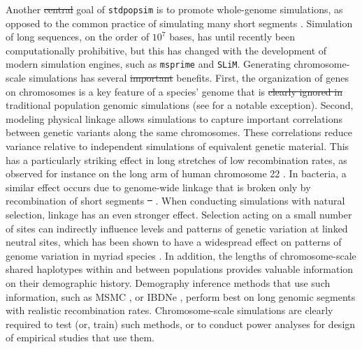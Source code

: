 \documentclass[hidelinks]{article}
\newcommand{\stdpopsim}{\texttt{stdpopsim}\xspace}
\providecommand{\DIFaddtex}[1]{{\protect\color{blue}\uwave{#1}}} %
\providecommand{\DIFdeltex}[1]{{\protect\color{red}\sout{#1}}}                      %
\providecommand{\DIFaddbegin}{} %
\providecommand{\DIFaddend}{} %
\providecommand{\DIFdelbegin}{} %
\providecommand{\DIFdelend}{} %
\providecommand{\DIFadd}[1]{\texorpdfstring{\DIFaddtex{#1}}{#1}} %
\providecommand{\DIFdel}[1]{\texorpdfstring{\DIFdeltex{#1}}{}} %
\newcommand{\DIFscaledelfig}{0.5}
\newlength{\DIFdelgraphicswidth} %
\newlength{\DIFdelgraphicsheight} %
\newcommand{\DIFaddincludegraphics}[2][]{{\color{blue}\fbox{\DIFOincludegraphics[#1]{#2}}}} %
\newcommand{\DIFdelincludegraphics}[2][]{%
\sbox{\DIFdelgraphicsbox}{\DIFOincludegraphics[#1]{#2}}%
\settoboxwidth{\DIFdelgraphicswidth}{\DIFdelgraphicsbox} %
\settoboxtotalheight{\DIFdelgraphicsheight}{\DIFdelgraphicsbox} %
\scalebox{\DIFscaledelfig}{%
\parbox[b]{\DIFdelgraphicswidth}{\usebox{\DIFdelgraphicsbox}\\[-\baselineskip] \rule{\DIFdelgraphicswidth}{0em}}\llap{\resizebox{\DIFdelgraphicswidth}{\DIFdelgraphicsheight}{%
\setlength{\unitlength}{\DIFdelgraphicswidth}%
\begin{picture}(1,1)%
\thicklines\linethickness{2pt} %
{\color[rgb]{1,0,0}\put(0,0){\framebox(1,1){}}}%
{\color[rgb]{1,0,0}\put(0,0){\line( 1,1){1}}}%
{\color[rgb]{1,0,0}\put(0,1){\line(1,-1){1}}}%
\end{picture}%
}\hspace*{3pt}}} %
} %
\DeclareRobustCommand{\DIFaddbegin}{\DIFOaddbegin \let\includegraphics\DIFaddincludegraphics} %
\DeclareRobustCommand{\DIFaddend}{\DIFOaddend \let\includegraphics\DIFOincludegraphics} %
\DeclareRobustCommand{\DIFdelbegin}{\DIFOdelbegin \let\includegraphics\DIFdelincludegraphics} %
\DeclareRobustCommand{\DIFdelend}{\DIFOaddend \let\includegraphics\DIFOincludegraphics} %
\begin{document}
Another \DIFdelbegin \DIFdel{central }\DIFdelend \DIFaddbegin \DIFadd{important }\DIFaddend goal of \stdpopsim is to promote whole-genome simulations,
as opposed to the common practice of simulating many short segments  \citep[see, e.g.,][]{harris2016genetic}.
Simulation of long sequences, on the order of $10^7$ bases,
has until recently been computationally prohibitive,
but this has changed with the development of modern simulation engines,
such as \texttt{msprime} and \texttt{SLiM}.
Generating chromosome-scale simulations has several \DIFdelbegin \DIFdel{important }\DIFdelend \DIFaddbegin \DIFadd{key }\DIFaddend benefits.
First, the organization of genes on chromosomes is a key feature of a species' genome that is \DIFdelbegin \DIFdel{clearly ignored in }\DIFdelend \DIFaddbegin \DIFadd{ignored in many }\DIFaddend traditional population genomic simulations
 (see \cite{schrider2020background} for a notable exception).
%
Second, modeling physical linkage allows simulations to capture
important correlations between genetic variants along the same chromosomes.
These correlations reduce variance relative to independent simulations of equivalent genetic material.
This has a particularly striking effect in long stretches of low recombination rates,
as observed for instance on the long arm of human chromosome 22 \citep{Dawson2002}.
In bacteria, a similar effect occurs due to genome-wide linkage that is broken only
by recombination of short segments \DIFdelbegin \DIFdel{\mbox{%
\cite{Didelot2010}}\hspace{0pt}%
}\DIFdelend \DIFaddbegin \DIFadd{\mbox{%
\citep{Didelot2010}}\hspace{0pt}%
}\DIFaddend .
When conducting simulations with natural selection, linkage has
an even stronger effect. Selection acting on a small number of sites can
indirectly influence levels and patterns of genetic variation at linked neutral sites,
which has been shown to have a widespread
effect on patterns of genome variation in myriad species
\citep[e.g.,][]{McVicker2009,Charlesworth2012}. 
In addition, the lengths of chromosome-scale shared haplotypes within and
between populations provides valuable information on their demographic history.
Demography inference methods that use such information,
such as MSMC \citep{Schiffels2020}, or IBDNe \citep{browning2015accurate},
perform best on long genomic segments with realistic recombination rates.
Chromosome-scale simulations are clearly required to test (or, train) such methods,
or to conduct power analyses for design of empirical studies that use them.
\end{document}
